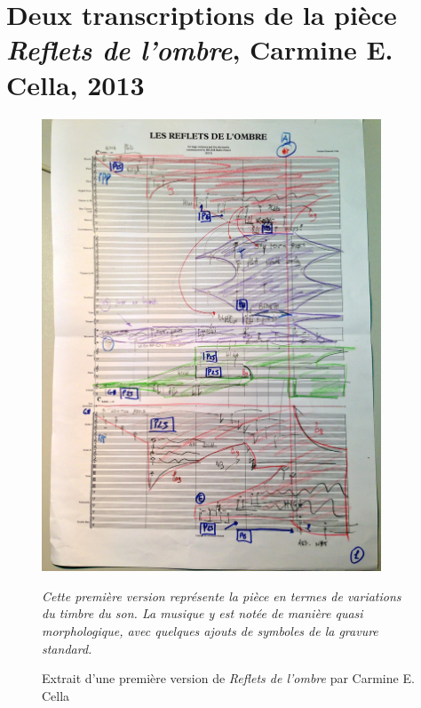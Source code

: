 \section{Deux transcriptions de la pièce \textit{Reflets de l'ombre}, Carmine E. Cella, 2013}
\label{sec:refletsDeLOmbre}
\begin{figure}[H]
	\centering
	\includegraphics[keepaspectratio=true, width=0.9\textwidth]{Annexes/i/refletsDeLOmbreFantaisie.jpg}
	\caption{Extrait d'une première version de \textit{Reflets de l'ombre} par Carmine E. Cella}
	\medskip
	\small
	\textit{Cette première version représente la pièce en termes de variations du timbre du son.
	La musique y est notée de manière quasi morphologique, avec quelques ajouts de symboles de la gravure standard.}	
	\label{fig:refletsDeLOmbreFantaisie}
\end{figure}

